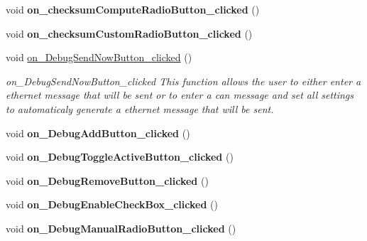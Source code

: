 \begin{DoxyCompactItemize}
\item 
\hypertarget{class_main_window_ab61a70cb62b2bc922ac479f23a88e50d}{}void {\bfseries on\+\_\+checksum\+Compute\+Radio\+Button\+\_\+clicked} ()\label{class_main_window_ab61a70cb62b2bc922ac479f23a88e50d}

\item 
\hypertarget{class_main_window_a62373ed1ad6a163e38690852a27a4851}{}void {\bfseries on\+\_\+checksum\+Custom\+Radio\+Button\+\_\+clicked} ()\label{class_main_window_a62373ed1ad6a163e38690852a27a4851}

\item 
\hypertarget{class_main_window_a93b971f29c7a801b978860c72621c75f}{}void \hyperlink{class_main_window_a93b971f29c7a801b978860c72621c75f}{on\+\_\+\+Debug\+Send\+Now\+Button\+\_\+clicked} ()\label{class_main_window_a93b971f29c7a801b978860c72621c75f}

\begin{DoxyCompactList}\small\item\em on\+\_\+\+Debug\+Send\+Now\+Button\+\_\+clicked This function allows the user to either enter a ethernet message that will be sent or to enter a can message and set all settings to automaticaly generate a ethernet message that will be sent. \end{DoxyCompactList}\item 
\hypertarget{class_main_window_aa23d984401f68b77a3ad4f86c066772d}{}void {\bfseries on\+\_\+\+Debug\+Add\+Button\+\_\+clicked} ()\label{class_main_window_aa23d984401f68b77a3ad4f86c066772d}

\item 
\hypertarget{class_main_window_aeb03be7f76187eb6cf15b0040aee2d29}{}void {\bfseries on\+\_\+\+Debug\+Toggle\+Active\+Button\+\_\+clicked} ()\label{class_main_window_aeb03be7f76187eb6cf15b0040aee2d29}

\item 
\hypertarget{class_main_window_affaa67dd793fb6c2f891d026655b70cc}{}void {\bfseries on\+\_\+\+Debug\+Remove\+Button\+\_\+clicked} ()\label{class_main_window_affaa67dd793fb6c2f891d026655b70cc}

\item 
\hypertarget{class_main_window_acc524496197c940e49d6ff80a134bd29}{}void {\bfseries on\+\_\+\+Debug\+Enable\+Check\+Box\+\_\+clicked} ()\label{class_main_window_acc524496197c940e49d6ff80a134bd29}

\item 
\hypertarget{class_main_window_a472c3d7b7542bcf87d59f1953b27283b}{}void {\bfseries on\+\_\+\+Debug\+Manual\+Radio\+Button\+\_\+clicked} ()\label{class_main_window_a472c3d7b7542bcf87d59f1953b27283b}


\end{DoxyCompactItemize}
